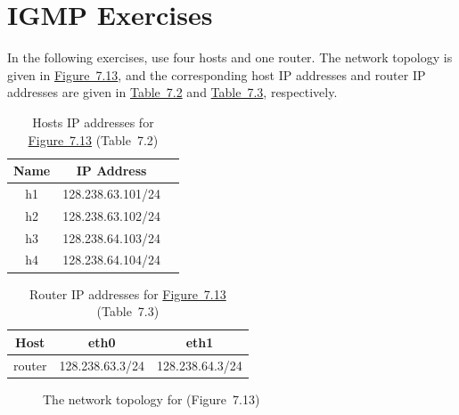 \documentclass{../UTNetLab}
\begin{document}
\part{IGMP Exercises}\label{sec:igmp}
In the following exercises, use four hosts and one router.
The network topology is given in \hyperref[fig:7.13]{Figure~7.13}, and the corresponding host IP addresses and router IP addresses are given in \hyperref[tab:7.2]{Table~7.2} and \hyperref[tab:7.3]{Table~7.3}, respectively.

\begin{table}[H]
    \caption{Hosts IP addresses for \hyperref[fig:7.13]{Figure~7.13} (Table~7.2)}
    \label{tab:7.2}
    \centering
    \begin{tabular}{ *3c }
        \hline \hline
        Name & IP Address        \\
        \hline
        h1   & 128.238.63.101/24 \\
        h2   & 128.238.63.102/24 \\
        h3   & 128.238.64.103/24 \\
        h4   & 128.238.64.104/24 \\
        \hline \hline
    \end{tabular}
\end{table}

\begin{table}[H]
    \caption{Router IP addresses for \hyperref[fig:7.13]{Figure~7.13} (Table~7.3)}
    \label{tab:7.3}
    \centering
    \begin{tabular}{ *3c }
        \hline \hline
        Host   & eth0            & eth1            \\
        \hline
        router & 128.238.63.3/24 & 128.238.64.3/24 \\
        \hline \hline
    \end{tabular}
\end{table}

\begin{figure}[H]
    \centering
    \caption{The network topology for  (Figure~7.13)}
    \label{fig:7.13}
\end{figure}
\end{document}
